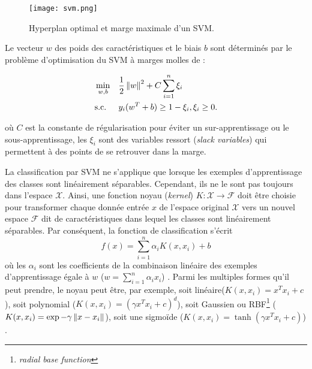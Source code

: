 \begin{figure}[!htb]
	\centering
	\texttt{[image: svm.png]}
	\caption{Hyperplan optimal et marge maximale d'un SVM.}\label{fig:sensresultat:svm}
\end{figure}

 Le vecteur  $w$ des  poids des caractéristiques et le biais $b$ sont déterminés par le problème d'optimisation du \og SVM à marges molles \fg{} de \citet{Cortes1995svm} :
 

\begin{equation*}
\begin{aligned}
& \mathop{\mathrm{min}}\limits\limits_{w,b}
& &\frac{1}{2}\left\lVert w\right\rVert^2 + C \sum\limits^n_{i=1} \xi_i \\
& \text{s.c.}
& & y_i(w^T+b)\geq 1-\xi_i, \xi_i \geq 0.
\end{aligned}
\end{equation*}

où $C$ est la constante de régularisation pour éviter un sur-apprentissage ou le sous-apprentissage, les $\xi_i$ sont des variables ressort (\textit{slack variables}) qui permettent à des points de se retrouver dans la marge. 


La classification par SVM ne s'applique que lorsque les exemples d'apprentissage des classes sont linéairement séparables. Cependant, ils ne le sont pas toujours dans l'espace  $\mathcal{X}$. Ainsi, une fonction \og noyau \fg{} (\textit{kernel}) $K: \mathcal{X} \longrightarrow \mathcal{F}$ doit être choisie pour transformer chaque donnée entrée $x$ de l'espace original  $\mathcal{X}$ vers un nouvel espace  $\mathcal{F}$ dit de caractéristiques dans lequel les classes sont linéairement séparables. Par conséquent, la fonction de classification s'écrit \[f(x) = \sum\limits_{i=1}^n \alpha_i K(x,x_i) + b\] où les $\alpha_i$ sont les coefficients de la combinaison linéaire des exemples d'apprentissage égale à $w$ ($w = \sum\limits_{i=1}^n\alpha_i x_i$) \citep{Ben-Hur2010svm}. Parmi les multiples formes qu'il peut prendre, le noyau peut être, par exemple, soit linéaire($K(x,x_i) = x^Tx_i + c$), soit polynomial ($K(x,x_i) = (\gamma x^Tx_i + c)^d$), soit Gaussien ou RBF\footnote{\textit{radial base function}} ($K(x,x_i) = \exp{-\gamma \left\lVert x-x_i\right\rVert}$), soit une sigmoïde ($K(x,x_i) = \tanh(\gamma x^Tx_i + c)$) \citep{Amami2015PracticalModelSelectionSVM}.

